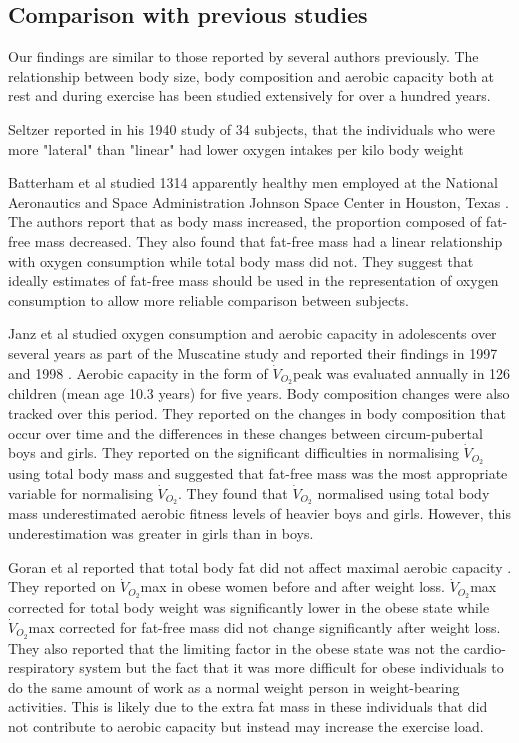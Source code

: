 \subsection{Comparison with previous studies}
Our findings are similar to those reported by several authors previously. The relationship between body size, body composition and aerobic capacity both at rest and during exercise has been studied extensively for over a hundred years. 

Seltzer reported in his 1940 study of 34 subjects, that the individuals who were more "lateral" than "linear" had lower oxygen intakes per kilo body weight 

Batterham et al studied 1314 apparently healthy men employed at the National Aeronautics and Space Administration Johnson Space Center in Houston, Texas \parencite{batterham_modeling_1999}. The authors report that as body mass increased, the proportion composed of fat-free mass decreased. They also found that fat-free mass had a linear relationship with oxygen consumption while total body mass did not. They suggest that ideally estimates of fat-free mass should be used in the representation of oxygen consumption to allow more reliable comparison between subjects. 

Janz et al studied oxygen consumption and aerobic capacity in adolescents over several years as part of the Muscatine study and reported their findings in 1997\parencite{janz_three-year_1997} and 1998 \parencite{janz_longitudinal_1998}. Aerobic capacity in the form of $\dot{V}_{O_2}$peak was evaluated annually in 126 children (mean age 10.3 years) for five years. Body composition changes were also tracked over this period. They reported on the changes in body composition that occur over time and the differences in these changes between circum-pubertal boys and girls. They reported on the significant difficulties in normalising $\dot{V}_{O_2}$ using total body mass and suggested that fat-free mass was the most appropriate variable for normalising $\dot{V}_{O_2}$. They found that $\dot{V}_{O_2}$ normalised using total body mass underestimated aerobic fitness levels of heavier boys and girls. However, this underestimation was greater in girls than in boys. 

Goran et al reported that total body fat did not affect maximal aerobic capacity \parencite{goran_total_2000}. They reported on $\dot{V}_{O_2}$max in obese women before and after weight loss. $\dot{V}_{O_2}$max corrected for total body weight was significantly lower in the obese state while $\dot{V}_{O_2}$max corrected for fat-free mass did not change significantly after weight loss. They also reported that the limiting factor in the obese state was not the cardio-respiratory system but the fact that it was more difficult for obese individuals to do the same amount of work as a normal weight person in weight-bearing activities. This is likely due to the extra fat mass in these individuals that did not contribute to aerobic capacity but instead may increase the exercise load.

